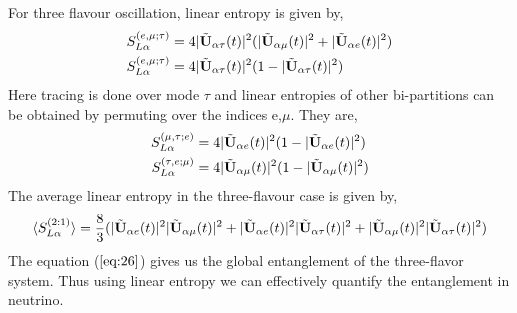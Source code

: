\documentclass[12pt,a4paper]{report}
\begin{document}
For three flavour oscillation, linear entropy is given by,
\begin{equation}
\begin{split}
S_{L\alpha}^{(e,\mu;\tau)}& = 4|\Tilde{\textbf{U}}_{\alpha \tau}(t)|^{2}(|\Tilde{\textbf{U}}_{\alpha \mu}(t)|^{2} + |\Tilde{\textbf{U}}_{\alpha e}(t)|^{2})\\
S_{L\alpha}^{(e,\mu;\tau)}&=  4|\Tilde{\textbf{U}}_{\alpha \tau}(t)|^{2}(1-|\Tilde{\textbf{U}}_{\alpha \tau}(t)|^{2})
\end{split}
\end{equation}
Here tracing is done over mode $\tau$ and linear entropies of other bi-partitions can be obtained by permuting over the indices e,$\mu$. They are, 
\begin{equation}
\begin{split}
S_{L\alpha}^{(\mu,\tau;e)}&=  4|\Tilde{\textbf{U}}_{\alpha e}(t)|^{2}(1-|\Tilde{\textbf{U}}_{\alpha e}(t)|^{2})\\
S_{L\alpha}^{(\tau,e;\mu)}&=  4|\Tilde{\textbf{U}}_{\alpha \mu}(t)|^{2}(1-|\Tilde{\textbf{U}}_{\alpha \mu}(t)|^{2})
\end{split}
\end{equation}
The average linear entropy in the three-flavour case is given by,
\begin{equation}
\label{eq:26}
    \langle S_{L\alpha}^{(2:1)}\rangle = \frac{8}{3}(|\Tilde{\textbf{U}}_{\alpha e}(t)|^{2}|\Tilde{\textbf{U}}_{\alpha \mu}(t)|^{2} + |\Tilde{\textbf{U}}_{\alpha e}(t)|^{2}|\Tilde{\textbf{U}}_{\alpha \tau}(t)|^{2} + |\Tilde{\textbf{U}}_{\alpha \mu}(t)|^{2}|\Tilde{\textbf{U}}_{\alpha \tau}(t)|^{2})
\end{equation}
The equation ($\ref{eq:26}$) gives us the global entanglement of the three-flavor system. Thus using linear entropy we can effectively quantify the entanglement in neutrino.


\newpage
\thispagestyle{empty}
\mbox{}
\newpage
\end{document}
